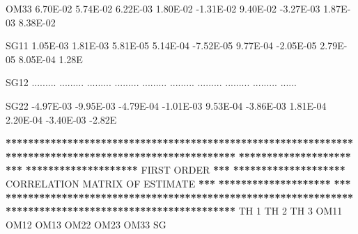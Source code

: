 \documentclass[
  11pt,
  krantz2, a4paper, twoside]{krantz}
\newenvironment{Shaded}{\begin{snugshade}}{\end{snugshade}}
\newcommand{\DecValTok}[1]{\textcolor[rgb]{0.00,0.00,0.81}{#1}}
\newcommand{\ErrorTok}[1]{\textcolor[rgb]{0.64,0.00,0.00}{\textbf{#1}}}
\newcommand{\FloatTok}[1]{\textcolor[rgb]{0.00,0.00,0.81}{#1}}
\newcommand{\NormalTok}[1]{#1}
\newcommand{\OperatorTok}[1]{\textcolor[rgb]{0.81,0.36,0.00}{\textbf{#1}}}
\newcommand{\StringTok}[1]{\textcolor[rgb]{0.31,0.60,0.02}{#1}}
\theoremstyle{definition}
\theoremstyle{definition}
\theoremstyle{definition}
\theoremstyle{remark}
\begin{document}
\begin{Shaded}
\begin{Highlighting}[]
\NormalTok{OM33    }\FloatTok{6.70E{-}02}  \FloatTok{5.74E{-}02}  \FloatTok{6.22E{-}03}  \FloatTok{1.80E{-}02} \FloatTok{{-}1.31E{-}02}  \FloatTok{9.40E{-}02} \FloatTok{{-}3.27E{-}03}  \FloatTok{1.87E{-}03}  \FloatTok{8.38E{-}02}       
                                                                                                       
\NormalTok{SG11    }\FloatTok{1.05E{-}03}  \FloatTok{1.81E{-}03}  \FloatTok{5.81E{-}05}  \FloatTok{5.14E{-}04} \FloatTok{{-}7.52E{-}05}  \FloatTok{9.77E{-}04} \FloatTok{{-}2.05E{-}05}  \FloatTok{2.79E{-}05}  \FloatTok{8.05E{-}04}  \FloatTok{1.28}\NormalTok{E}
                                                                                                       
\NormalTok{SG12   ......... ......... ......... ......... ......... ......... ......... ......... ......... ......}
                                                                                                       
\NormalTok{SG22   }\FloatTok{{-}4.97E{-}03} \FloatTok{{-}9.95E{-}03} \FloatTok{{-}4.79E{-}04} \FloatTok{{-}1.01E{-}03}  \FloatTok{9.53E{-}04} \FloatTok{{-}3.86E{-}03}  \FloatTok{1.81E{-}04}  \FloatTok{2.20E{-}04} \FloatTok{{-}3.40E{-}03} \FloatTok{{-}2.82}\NormalTok{E}
                                                                                                       
                                                                                                       
\OperatorTok{**}\ErrorTok{*****************************************************************************************************}
\ErrorTok{********************}\StringTok{                                                                                }\ErrorTok{***}
\ErrorTok{********************}\StringTok{                                   }\NormalTok{FIRST ORDER                                  }\OperatorTok{**}\ErrorTok{*}
\ErrorTok{********************}\StringTok{                          }\NormalTok{CORRELATION MATRIX OF ESTIMATE                        }\OperatorTok{**}\ErrorTok{*}
\ErrorTok{********************}\StringTok{                                                                                }\ErrorTok{***}
\ErrorTok{*******************************************************************************************************}
\StringTok{                                                                                                       }
\StringTok{                                                                                                       }
\StringTok{           }\NormalTok{TH }\DecValTok{1}\NormalTok{      TH }\DecValTok{2}\NormalTok{      TH }\DecValTok{3}\NormalTok{      OM11      OM12      OM13      OM22      OM23      OM33      SG}
                                                                                                       

\end{Highlighting}
\end{Shaded}
\end{document}
